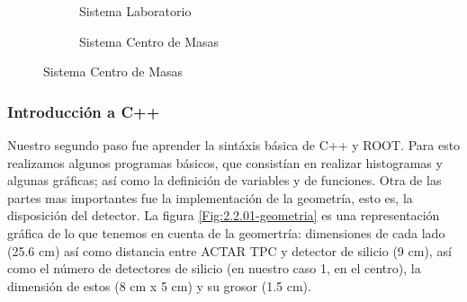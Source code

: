 \documentclass[12pt,a4paper]{article}
\numberwithin{equation}{section}
\numberwithin{figure}{section}
\begin{document}
\begin{figure}[h!] \centering
\begin{subfigure}[b]{0.45\linewidth} \centering
    \caption{Sistema Laboratorio}
    \label{Fig:2.3.01-Lab}
\end{subfigure}
\begin{subfigure}[b]{0.45\linewidth} \centering
    \caption{Sistema Centro de Masas}
    \label{Fig:2.3.01-CM}
\end{subfigure}
\end{figure}

\subsubsection{Introducción a C++}

Nuestro segundo paso fue aprender la sintáxis básica de C++ y ROOT. Para esto realizamos algunos programas básicos, que consistían en realizar histogramas y algunas gráficas; así como la definición de variables y de funciones. Otra de las partes mas importantes fue la implementación de la geometría, esto es, la disposición del detector. La figura \ref{Fig:2.2.01-geometria} es una representación gráfica de lo que tenemos en cuenta de la geomertría: dimensiones de cada lado (25.6 cm) así como distancia entre ACTAR TPC y detector de silicio (9 cm), así como el número de detectores de silicio (en nuestro caso 1, en el centro), la dimensión de estos (8 cm x 5 cm) y su grosor (1.5 cm).
\end{document}
